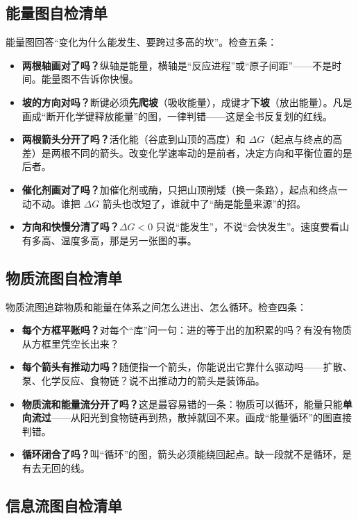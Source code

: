 \subsection{能量图自检清单}

能量图回答“变化为什么能发生、要跨过多高的坎”。检查五条：

\begin{itemize}[itemsep=2pt]
\item \textbf{两根轴画对了吗？}纵轴是能量，横轴是“反应进程”或“原子间距”——不是时间。能量图不告诉你快慢。
\item \textbf{坡的方向对吗？}断键必须\textbf{先爬坡}（吸收能量），成键才\textbf{下坡}（放出能量）。凡是画成“断开化学键释放能量”的图，一律判错——这是全书反复划的红线。
\item \textbf{两根箭头分开了吗？}活化能（谷底到山顶的高度）和 $\Delta G$（起点与终点的高差）是两根不同的箭头。改变化学速率动的是前者，决定方向和平衡位置的是后者。
\item \textbf{催化剂画对了吗？}加催化剂或酶，只把山顶削矮（换一条路），起点和终点一动不动。谁把 $\Delta G$ 箭头也改短了，谁就中了“酶是能量来源”的招。
\item \textbf{方向和快慢分清了吗？}$\Delta G<0$ 只说“能发生”，不说“会快发生”。速度要看山有多高、温度多高，那是另一张图的事。
\end{itemize}

\subsection{物质流图自检清单}

物质流图追踪物质和能量在体系之间怎么进出、怎么循环。检查四条：

\begin{itemize}[itemsep=2pt]
\item \textbf{每个方框平账吗？}对每个“库”问一句：进的等于出的加积累的吗？有没有物质从方框里凭空长出来？
\item \textbf{每个箭头有推动力吗？}随便指一个箭头，你能说出它靠什么驱动吗——扩散、泵、化学反应、食物链？说不出推动力的箭头是装饰品。
\item \textbf{物质流和能量流分开了吗？}这是最容易错的一条：物质可以循环，能量只能\textbf{单向流过}——从阳光到食物链再到热，散掉就回不来。画成“能量循环”的图直接判错。
\item \textbf{循环闭合了吗？}叫“循环”的图，箭头必须能绕回起点。缺一段就不是循环，是有去无回的线。
\end{itemize}

\subsection{信息流图自检清单}

